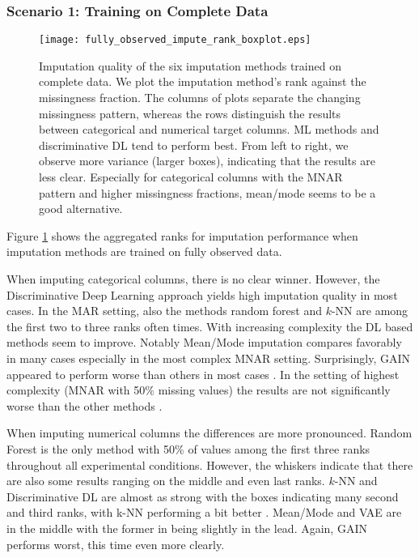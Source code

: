 \subsubsection{Scenario 1: Training on Complete Data}

\begin{figure}\centering
    \texttt{[image: fully\_observed\_impute\_rank\_boxplot.eps]}
    \caption[Imputation Ranks - Fully Observed]{Imputation quality of the six imputation methods trained on complete data. We plot the imputation method's rank against the missingness fraction. The columns of plots separate the changing missingness pattern, whereas the rows distinguish the results between categorical and numerical target columns. ML methods and discriminative DL tend to perform best. From left to right, we observe more variance (larger boxes), indicating that the results are less clear. Especially for categorical columns with the MNAR pattern and higher missingness fractions, mean/mode seems to be a good alternative.
	}
	\label{fig:fully_observed_impute_rank_boxplot}
\end{figure}

Figure \ref{fig:fully_observed_impute_rank_boxplot} shows the aggregated ranks for imputation performance when imputation methods are trained on fully observed data.

When imputing categorical columns, there is no clear winner. However, the Discriminative Deep Learning approach yields high imputation quality in most cases. In the MAR setting, also the methods random forest and $k$-NN are among the first two to three ranks often times. With increasing complexity the DL based methods seem to improve. Notably Mean/Mode imputation compares favorably in many cases especially in the most complex MNAR setting. Surprisingly, GAIN appeared to perform worse than others in most cases . In the setting of highest complexity (MNAR with 50\% missing values) the results are not significantly worse than the other methods .

When imputing numerical columns the differences are more pronounced. Random Forest is the only method with 50\% of values among the first three ranks throughout all experimental conditions. However, the whiskers indicate that there are also some results ranging on the middle and even last ranks. $k$-NN and Discriminative DL are almost as strong with the boxes indicating many second and third ranks, with k-NN performing a bit better . Mean/Mode and VAE are in the middle with the former in being slightly in the lead.  Again, GAIN performs worst, this time even more clearly.

